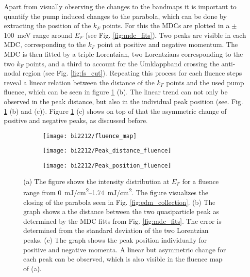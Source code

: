Apart from visually observing the changes to the bandmaps it is important to quantify the pump induced changes to the parabola, which can be done by extracting the position of the $k_F$ points.
For this the MDCs are plotted in a $\pm$\qty{100}{\milli\electronvolt} range around $E_F$ (see Fig. \ref{fig:mdc_fits}).
Two peaks are visible in each MDC, corresponding to the $k_F$ point at positive and negative momentum.
The MDC is then fitted by a triple Lorentzian, two Lorentzians corresponding to the two $k_F$ points, and a third to account for the Umklappband crossing the anti-nodal region (see Fig. \ref{fig:fs_cut}).
Repeating this process for each fluence steps reveal a linear relation between the distance of the $k_F$ points and the used pump fluence, which can be seen in figure \ref{fig:fluence_map} (b).
The linear trend can not only be observed in the peak distance, but also in the individual peak position (see. Fig. \ref{fig:fluence_map} (b) and (c)).
Figure \ref{fig:fluence_map} (c) shows on top of that the asymmetric change of positive and negative peaks, as discussed before.

\begin{figure}[t]
	\centering
	\begin{subfigure}[b]{0.25\textwidth}
		\texttt{[image: bi2212/fluence\_map]}
		\caption{}
	\end{subfigure}
	\begin{subfigure}[b]{0.35\textwidth}
		\texttt{[image: bi2212/Peak\_distance\_fluence]}
		\caption{}
	\end{subfigure}
	\begin{subfigure}[b]{0.35\textwidth}
		\texttt{[image: bi2212/Peak\_position\_fluence]}
		\caption{}
	\end{subfigure}
	\caption{(a) The figure shows the intensity distribution at $E_F$ for a fluence range from \qtyrange{0}{1.74}{\milli\joule/\centi\meter\squared}. The figure visualizes the closing of the parabola seen in Fig. \ref{fig:edm_collection}. (b) The graph shows a the distance between the two quasiparticle peak as determined by the MDC fitts from Fig. \ref{fig:mdc_fits}. The error is determined from the standard deviation of the two Lorentzian peaks. (c) The graph shows the peak position individually for positive and negative momenta. A linear but asymmetric change for each peak can be observed, which is also visible in the fluence map of (a).}
	\label{fig:fluence_map}
\end{figure}


